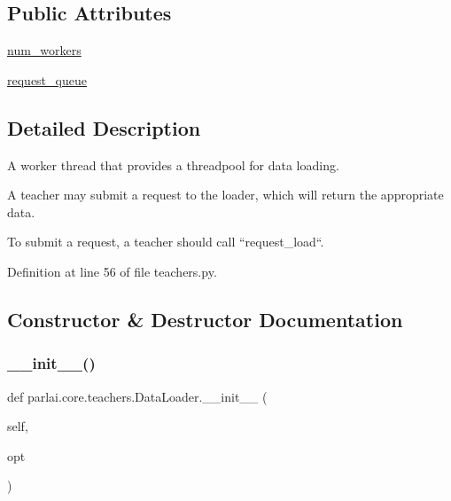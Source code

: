 \subsection*{Public Attributes}
\begin{DoxyCompactItemize}
\item 
\hyperlink{classparlai_1_1core_1_1teachers_1_1DataLoader_a223a0d846ce98840f8f3338611f94d34}{num\+\_\+workers}
\item 
\hyperlink{classparlai_1_1core_1_1teachers_1_1DataLoader_a960bf1159e437cfb304352213df50a8f}{request\+\_\+queue}
\end{DoxyCompactItemize}


\subsection{Detailed Description}
\begin{DoxyVerb}A worker thread that provides a threadpool for data loading.

A teacher may submit a request to the loader, which will return the
appropriate data.

To submit a request, a teacher should call ``request_load``.
\end{DoxyVerb}
 

Definition at line 56 of file teachers.\+py.



\subsection{Constructor \& Destructor Documentation}
\mbox{\label{classparlai_1_1core_1_1teachers_1_1DataLoader_af06f90bbe1a2d310ac43e963c2eb8f88}} 
\subsubsection{\texorpdfstring{\+\_\+\+\_\+init\+\_\+\+\_\+()}{\_\_init\_\_()}}
{\footnotesize\ttfamily def parlai.\+core.\+teachers.\+Data\+Loader.\+\_\+\+\_\+init\+\_\+\+\_\+ (\begin{DoxyParamCaption}\item[{}]{self,  }\item[{}]{opt }\end{DoxyParamCaption})}



